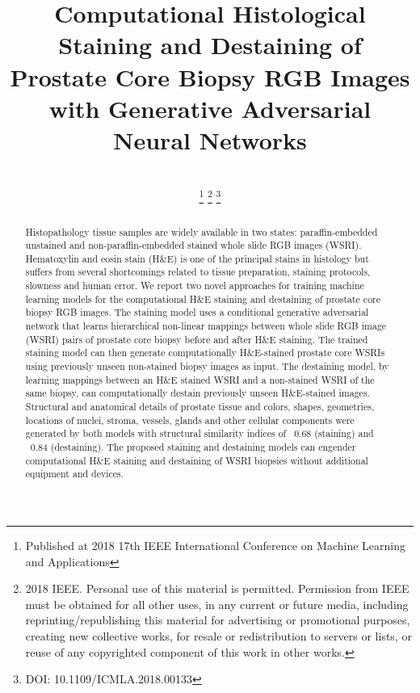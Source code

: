 \documentclass[10pt, conference, compsocconf]{IEEEtran}
\begin{document}
\IEEEoverridecommandlockouts
\title{Computational Histological Staining and Destaining of Prostate Core Biopsy RGB Images with Generative Adversarial Neural Networks}



\author{ \\
\thanks{Published at 2018 17th IEEE International Conference on Machine Learning and Applications}
\thanks{ 2018 IEEE.  Personal use of this material is permitted.  Permission from IEEE must be obtained for all other uses, in any current or future media, including reprinting/republishing this material for advertising or promotional purposes, creating new collective works, for resale or redistribution to servers or lists, or reuse of any copyrighted component of this work in other works.}
\thanks{DOI: 10.1109/ICMLA.2018.00133}
}



\maketitle


\begin{abstract}
Histopathology tissue samples are widely available in two states: paraffin-embedded unstained and non-paraffin-embedded stained whole slide RGB images (WSRI). Hematoxylin and eosin stain (H\&E) is one of the principal stains in histology but suffers from several shortcomings related to tissue preparation, staining protocols, slowness and human error. We report two novel approaches for training machine learning models for the computational H\&E staining and destaining of prostate core biopsy RGB images. The staining model uses a conditional generative adversarial network that learns hierarchical non-linear mappings between whole slide RGB image (WSRI) pairs of prostate core biopsy before and after H\&E staining. The trained staining model can then generate computationally H\&E-stained prostate core WSRIs using previously unseen non-stained biopsy images as input. The destaining model, by learning mappings between an H\&E stained WSRI and a non-stained WSRI of the same biopsy, can computationally destain previously unseen H\&E-stained images. Structural and anatomical details of prostate tissue and colors, shapes, geometries, locations of nuclei, stroma, vessels, glands and other cellular components were generated by both models with structural similarity indices of ~0.68 (staining) and ~0.84 (destaining). The proposed staining and destaining models can engender computational H\&E staining and destaining of WSRI biopsies without additional equipment and devices.
\end{abstract}
\end{document}
